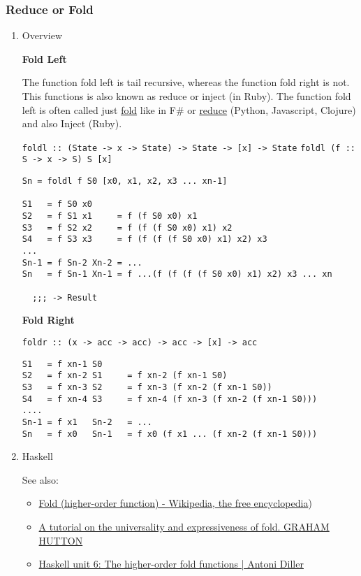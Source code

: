 \documentclass[11pt]{article}
\begin{document}
\subsubsection{Reduce or Fold}
\label{sec-1-9-4}
\begin{enumerate}
\item Overview
\label{sec-1-9-4-1}

\textbf{Fold Left}

The  function fold left is tail recursive, whereas the function fold
right is not. This functions is also known as reduce or inject (in
Ruby). The function fold left is often called just \uline{fold} like in F\#
or \uline{reduce} (Python, Javascript, Clojure) and also Inject (Ruby).

\texttt{foldl :: (State -> x -> State) -> State -> [x] -> State}
\texttt{foldl (f :: S -> x -> S)  S [x]}


\begin{verbatim}
Sn = foldl f S0 [x0, x1, x2, x3 ... xn-1]

S1   = f S0 x0
S2   = f S1 x1     = f (f S0 x0) x1
S3   = f S2 x2     = f (f (f S0 x0) x1) x2
S4   = f S3 x3     = f (f (f (f S0 x0) x1) x2) x3
...
Sn-1 = f Sn-2 Xn-2 = ...
Sn   = f Sn-1 Xn-1 = f ...(f (f (f (f S0 x0) x1) x2) x3 ... xn

  ;;; -> Result
\end{verbatim}


\textbf{Fold Right}

\texttt{foldr :: (x -> acc -> acc) -> acc -> [x] -> acc}

\begin{verbatim}
S1   = f xn-1 S0
S2   = f xn-2 S1     = f xn-2 (f xn-1 S0)
S3   = f xn-3 S2     = f xn-3 (f xn-2 (f xn-1 S0))
S4   = f xn-4 S3     = f xn-4 (f xn-3 (f xn-2 (f xn-1 S0)))
....
Sn-1 = f x1   Sn-2   = ...
Sn   = f x0   Sn-1   = f x0 (f x1 ... (f xn-2 (f xn-1 S0)))
\end{verbatim}

\item Haskell
\label{sec-1-9-4-2}

See also: 

\begin{itemize}
\item \href{https://en.wikipedia.org/wiki/Fold_(higher-order_function}{Fold (higher-order function) - Wikipedia, the free encyclopedia})
\item \href{http://www.cs.nott.ac.uk/~pszgmh/fold.pdf}{A tutorial on the universality and expressiveness of fold. GRAHAM HUTTON}
\item \href{http://www.cantab.net/users/antoni.diller/haskell/units/unit06.html}{Haskell unit 6: The higher-order fold functions | Antoni Diller}
\end{itemize}




\end{enumerate}
\end{document}
